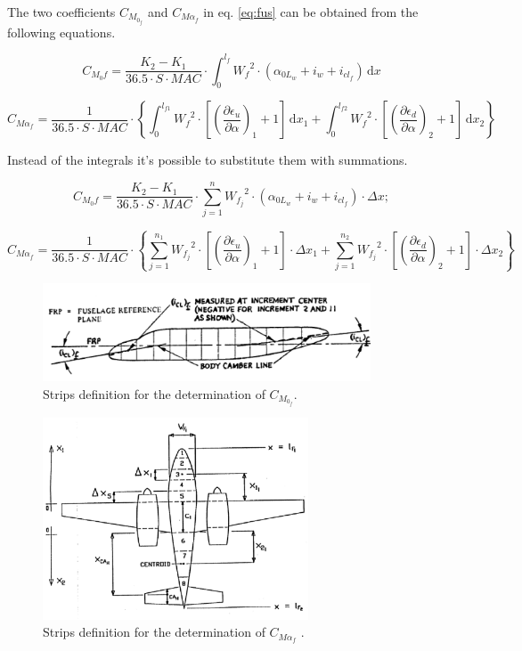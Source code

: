 The two coefficients $C_{M_{0_f}}$  and $C_{{M\alpha}_f}$ in eq. \ref{eq:fus} can be obtained from the following equations.

\begin{equation}
C_{M_{0}f}=\dfrac{K_2-K_1}{36.5\cdot S\cdot MAC}\cdot\int_0^{l_f} \! {W_f}^2\cdot\left(\alpha_{{0L}_w}+i_w+i_{{cl}_f}\right) \, \mathrm{d}x
\end{equation}

\begin{equation}
C_{{M\alpha}_f}=\dfrac{1}{36.5\cdot S\cdot MAC}\cdot \left\{ \int_0^{l_{f1}} \! {W_f}^2\cdot \left[ {\left( \dfrac{\partial \epsilon_u}{\partial \alpha} \right)}_1 +1\right] \, \mathrm{d}x_1 + \int_0^{l_{f2}} \! {W_f}^2\cdot \left[ {\left( \dfrac{\partial \epsilon_d}{\partial \alpha} \right)}_2 +1\right] \, \mathrm{d}x_2 \right\}
\end{equation}

Instead of the integrals it’s possible to substitute them with summations.

\begin{equation}
C_{M_{0}f}=\dfrac{K_2-K_1}{36.5\cdot S\cdot MAC}\cdot\sum_{j=1}^{n} \! {W_{f_j}}^2\cdot\left(\alpha_{{0L}_w}+i_w+i_{{cl}_f}\right)\cdot \Delta x;
\end{equation}

\begin{equation}
C_{{M\alpha}_f}=\dfrac{1}{36.5\cdot S\cdot MAC}\cdot \left\{ \sum_{j=1}^{n_1} \! {W_{f_j}}^2\cdot \left[ {\left( \dfrac{\partial \epsilon_u}{\partial \alpha} \right)}_1 +1\right] \cdot \Delta x_{1} + \sum_{j=1}^{n_2} \! {W_{f_j}}^2\cdot \left[ {\left( \dfrac{\partial \epsilon_d}{\partial \alpha} \right)}_2 +1\right] \cdot \Delta x_{2} \right\}
\end{equation}


\begin{figure}[H]
\centering
\includegraphics[height=2.9cm]{Immagini/stripszero}
\caption{Strips definition for the determination of $C_{M_{0_f}}$.}
\label{wing}
\end{figure}

\begin{figure}[H]
\centering
\includegraphics[height=6cm]{Immagini/stripsalfa}
\caption{Strips definition for the determination of $C_{{M\alpha}_f}$ .}
\label{wing}
\end{figure}



